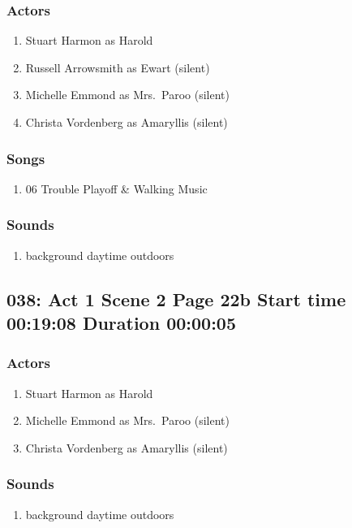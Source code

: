 \subsubsection{Actors}
\begin{enumerate}
\item Stuart Harmon as Harold
\item Russell Arrowsmith as Ewart (silent)
\item Michelle Emmond as Mrs.~Paroo (silent)
\item Christa Vordenberg as Amaryllis (silent)
\end{enumerate}

\subsubsection{Songs}
\begin{enumerate}
\item 06 Trouble Playoff \& Walking Music
\end{enumerate}\subsubsection{Sounds}
\begin{enumerate}
\item background daytime outdoors
\end{enumerate}
\subsection{038: Act 1 Scene 2 Page 22b Start time 00:19:08 Duration 00:00:05}

\subsubsection{Actors}
\begin{enumerate}
\item Stuart Harmon as Harold
\item Michelle Emmond as Mrs.~Paroo (silent)
\item Christa Vordenberg as Amaryllis (silent)
\end{enumerate}

\subsubsection{Sounds}
\begin{enumerate}
\item background daytime outdoors
\end{enumerate}
